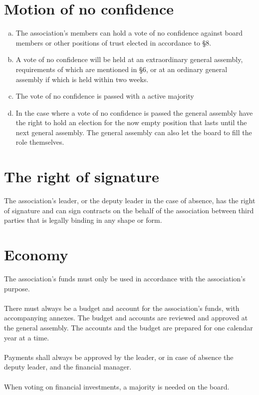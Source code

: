 \documentclass[12pt,a4paper,norsk]{article}
\begin{document}
\section{Motion of no confidence}
\begin{enumerate}[a)]
    \item The association's members can hold a vote of no confidence against board members or other positions of trust elected in accordance to §8.
    \item A vote of no confidence will be held at an extraordinary general assembly, requirements of which are mentioned in §6, or at an ordinary general assembly if which is held within two weeks.
    \item The vote of no confidence is passed with a  active majority
    \item In the case where a vote of no confidence is passed the general assembly have the right to hold an election for the now empty position that lasts until the next general assembly. The general assembly can also let the board to fill the role themselves.
\end{enumerate}



\section{The right of signature}

The association's leader, or the deputy leader in the case of absence, has the right of signature and can sign contracts on the behalf of the association  between third parties that is legally binding in any shape or form.


\section{Economy}

The association's funds must only be used in accordance with the association's purpose.
\\
\\
There must always be a budget and account for the association's funds, with accompanying annexes.
The budget and accounts are reviewed and approved at the general assembly. The accounts and the budget are prepared for one calendar year at a time.
\\
\\
Payments shall always be approved by the leader, or in case of absence the deputy leader, and the financial manager.
\\
\\
When voting on financial investments, a  majority is needed on the board.
\end{document}

